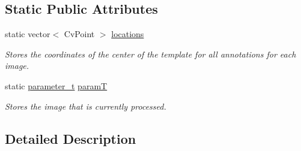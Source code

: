 \subsection*{Static Public Attributes}
\begin{DoxyCompactItemize}
\item 
\hypertarget{classannotatePos_aebc82ee22d7720e1502c5c127e58ac24}{
static vector$<$ CvPoint $>$ \hyperlink{classannotatePos_aebc82ee22d7720e1502c5c127e58ac24}{locations}}
\label{classannotatePos_aebc82ee22d7720e1502c5c127e58ac24}

\begin{DoxyCompactList}\small\item\em Stores the coordinates of the center of the template for all annotations for each image. \item\end{DoxyCompactList}\item 
\hypertarget{classannotatePos_ab4c4ad226708fb8ff35de9d106d249e1}{
static \hyperlink{structparameter__t}{parameter\_\-t} \hyperlink{classannotatePos_ab4c4ad226708fb8ff35de9d106d249e1}{paramT}}
\label{classannotatePos_ab4c4ad226708fb8ff35de9d106d249e1}

\begin{DoxyCompactList}\small\item\em Stores the image that is currently processed. \item\end{DoxyCompactList}\end{DoxyCompactItemize}


\subsection{Detailed Description}


